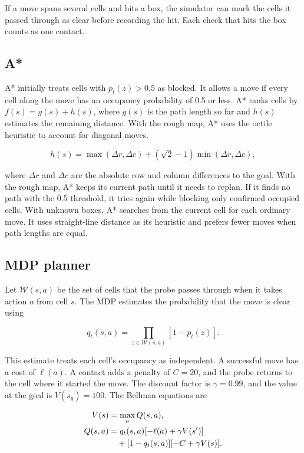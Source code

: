 \documentclass[letterpaper,journal]{IEEEtran}
\begin{document}
If a move spans several cells and hits a box, the simulator can mark the cells it passed through as clear before recording the hit. Each check that hits the box counts as one contact.

\subsection{A*}

A* initially treats cells with $p_t(z)>0.5$ as blocked. It allows a move if every cell along the move has an occupancy probability of 0.5 or less. A* ranks cells by $f(s)=g(s)+h(s)$, where $g(s)$ is the path length so far and $h(s)$ estimates the remaining distance. With the rough map, A* uses the octile heuristic to account for diagonal moves.

\begin{equation}
 h(s)=\max(\Delta r,\Delta c)+(\sqrt2-1)\min(\Delta r,\Delta c),
\end{equation}

where $\Delta r$ and $\Delta c$ are the absolute row and column differences to the goal. With the rough map, A* keeps its current path until it needs to replan. If it finds no path with the 0.5 threshold, it tries again while blocking only confirmed occupied cells. With unknown boxes, A* searches from the current cell for each ordinary move. It uses straight-line distance as its heuristic and prefers fewer moves when path lengths are equal.

\subsection{MDP planner}

Let $\mathcal W(s,a)$ be the set of cells that the probe passes through when it takes action $a$ from cell $s$. The MDP estimates the probability that the move is clear using

\begin{equation}
 q_t(s,a)=\prod_{z\in\mathcal W(s,a)}[1-p_t(z)].
\end{equation}

This estimate treats each cell's occupancy as independent. A successful move has a cost of $\ell(a)$. A contact adds a penalty of $C=20$, and the probe returns to the cell where it started the move. The discount factor is $\gamma=0.99$, and the value at the goal is $V(s_g)=100$. The Bellman equations are

\begin{align}
 V(s)&=\max_a Q(s,a),\\
 Q(s,a)&=q_t(s,a)[-\ell(a)+\gamma V(s')]\notag\\
 &\quad+[1-q_t(s,a)][-C+\gamma V(s)].
\end{align}
\end{document}
